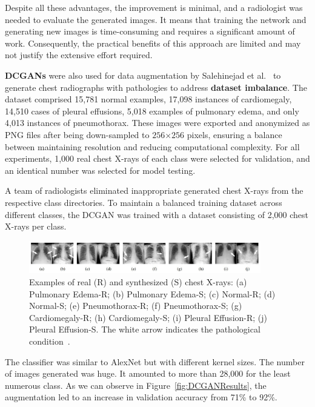 Despite all these advantages, the improvement is minimal, and a radiologist was needed to evaluate the generated images. It means that training the network and generating new images is time-consuming and requires a significant amount of work. Consequently, the practical benefits of this approach are limited and may not justify the extensive effort required.

\textbf{DCGANs} were also used for data augmentation by Salehinejad et al.~\cite{DCGANImbalanced} to generate chest radiographs with pathologies to address \textbf{dataset imbalance}. The dataset comprised 15,781 normal examples, 17,098 instances of cardiomegaly, 14,510 cases of pleural effusions, 5,018 examples of pulmonary edema, and only 4,013 instances of pneumothorax. These images were exported and anonymized as PNG files after being down-sampled to $256$×$256$ pixels, ensuring a balance between maintaining resolution and reducing computational complexity. For all experiments, 1,000 real chest X-rays of each class were selected for validation, and an identical number was selected for model testing.

A team of radiologists eliminated inappropriate generated chest X-rays from the respective class directories. To maintain a balanced training dataset across different classes, the DCGAN was trained with a dataset consisting of 2,000 chest X-rays per class. 

\begin{figure}[!h]
    \centering
    \includegraphics[width=0.9\textwidth]{Images/dcganAugmentation.jpg}
    \caption{Examples of real (R) and synthesized (S) chest X-rays: (a) Pulmonary Edema-R; (b) Pulmonary Edema-S; (c) Normal-R; (d) Normal-S; (e) Pneumothorax-R; (f) Pneumothorax-S; (g) Cardiomegaly-R; (h) Cardiomegaly-S; (i) Pleural Effusion-R; (j) Pleural Effusion-S. The white arrow indicates the pathological condition~\cite{DCGANImbalanced}.}
    \label{fig:dcganAug}
\end{figure}

The classifier was similar to AlexNet but with different kernel sizes. The number of images generated was huge. It amounted to more than 28,000 for the least numerous class. As we can observe in Figure~\ref{fig:DCGANResults}, the augmentation led to an increase in validation accuracy from 71\% to 92\%.


